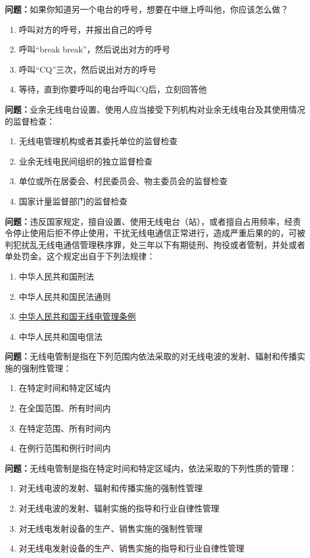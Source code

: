 \textbf{问题：}如果你知道另一个电台的呼号，想要在中继上呼叫他，你应该怎么做？
\begin{enumerate}[label=\Alph*), leftmargin=1.5cm]
	\item 呼叫对方的呼号，并报出自己的呼号
	\item 呼叫“break break”，然后说出对方的呼号
	\item 呼叫“CQ”三次，然后说出对方的呼号
	\item 等待，直到你要呼叫的电台呼叫CQ后，立刻回答他
\end{enumerate}

\textbf{问题：}业余无线电台设置、使用人应当接受下列机构对业余无线电台及其使用情况的监督检查：
\begin{enumerate}[label=\Alph*), leftmargin=1.5cm]
	\item 无线电管理机构或者其委托单位的监督检查
	\item 业余无线电民间组织的独立监督检查
	\item 单位或所在居委会、村民委员会、物主委员会的监督检查
	\item 国家计量监督部门的监督检查
\end{enumerate}

\textbf{问题：}违反国家规定，擅自设置、使用无线电台（站），或者擅自占用频率，经责令停止使用后拒不停止使用，干扰无线电通信正常进行，造成严重后果的的，可被判犯扰乱无线电通信管理秩序罪，处三年以下有期徒刑、拘役或者管制，并处或者单处罚金。这个规定出自于下列法规律：
\begin{enumerate}[label=\Alph*), leftmargin=1.5cm]
	\item 中华人民共和国刑法
	\item 中华人民共和国民法通则
	\item \href{http://www.gov.cn/zhengce/content/2016-11/25/content_5137687.htm}{中华人民共和国无线电管理条例}
	\item 中华人民共和国电信法
\end{enumerate}


\textbf{问题：}无线电管制是指在下列范围内依法采取的对无线电波的发射、辐射和传播实施的强制性管理：
\begin{enumerate}[label=\Alph*), leftmargin=1.5cm]
	\item 在特定时间和特定区域内
	\item 在全国范围、所有时间内
	\item 在特定范围、所有时间内
	\item 在例行范围和例行时间内
\end{enumerate}

\textbf{问题：}无线电管制是指在特定时间和特定区域内，依法采取的下列性质的管理：
\begin{enumerate}[label=\Alph*), leftmargin=1.5cm]
	\item 对无线电波的发射、辐射和传播实施的强制性管理
	\item 对无线电波的发射、辐射实施的指导和行业自律性管理
	\item 对无线电发射设备的生产、销售实施的强制性管理
	\item 对无线电发射设备的生产、销售实施的指导和行业自律性管理
\end{enumerate}

